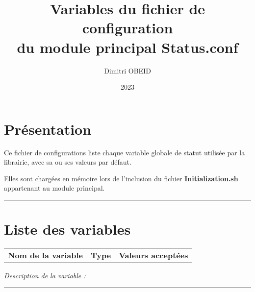 \documentclass[a4paper,10pt]{article}
\title{\color{sec1}Variables du fichier de configuration \\du module principal \color{path}Status.conf}\color{text}
\author{Dimitri OBEID}
\date{2023}
\begin{document}
    \maketitle
    \newpage

    \hypertarget{contents}{}
    \tableofcontents
    \newpage

    \color{sec1}
    \section{Présentation}\color{text}

    \begin{justify}
        Ce fichier de configurations liste chaque variable globale de statut utilisée par la librairie, avec sa ou ses valeurs par défaut.
    \end{justify}

    \begin{justify}
        Elles sont chargées en mémoire lors de l'inclusion du fichier \textbf{\color{path}Initialization.sh} appartenant au module principal.
    \end{justify}




    \color{sec1}\par\noindent\rule{\textwidth}{0.4pt}\color{text}

    \color{sec1}
    \section{Liste des variables}\color{text}

    \begin{justify}
        \begin{tabular}{l|l|l}
            \textbf{Nom de la variable} & \textbf{Type} & \textbf{Valeurs acceptées}
        \end{tabular}
    \end{justify}

    \begin{justify}
        \textit{Description de la variable :}
    \end{justify}


    \par\noindent\rule{\textwidth}{0.4pt}
\end{document}
